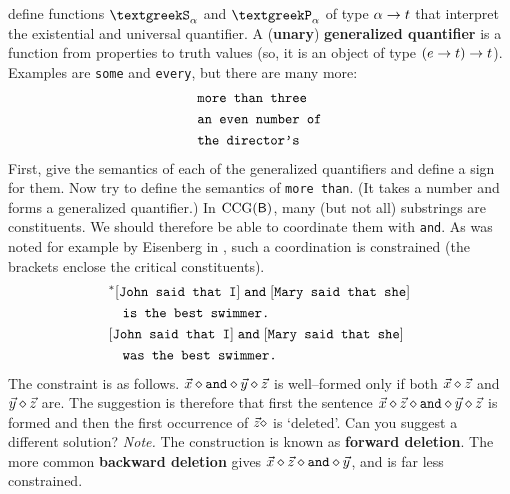 define functions $\GSi_{\alpha}$ and $\GPi_{\alpha}$ of type 
$\alpha \rightarrow t$ that interpret the existential and universal
quantifier. 
\vplatz
\exercise
A (\textbf{unary}) \textbf{generalized quantifier} is a function
from properties to truth values (so, it is an object of type
$(e \rightarrow t) \rightarrow t$). Examples are {\tt some} and {\tt every},
but there are many more:
\begin{align}
& \mbox{\tt more than three} \\
& \mbox{\tt an even number of} \\
& \mbox{\tt the director's}
\end{align}
First, give the semantics of each of the generalized
quantifiers and define a sign for them. Now try to
define the semantics of {\tt more than}. (It takes
a number and forms a generalized quantifier.)
\vplatz
\exercise
In $\operatorname{CCG}(\textsf{B})$, many (but not all) substrings are
constituents. We should therefore be able to coordinate them
with {\tt and}. As was noted for example by Eisenberg in
, such a coordination is
constrained (the brackets enclose the critical constituents).
\begin{align}
& ^{\ast}[\mbox{\tt John said that I}]\; \mbox{\tt and}\;
    [\mbox{\tt Mary said that she}] \\\notag
& \quad \mbox{\tt is the best swimmer.} \\
& [\mbox{\tt John said that I}] \;\mbox{\tt and}\;
    [\mbox{\tt Mary said that she}] \\\notag
    & \quad\mbox{\tt was the best swimmer.} 
\end{align}
The constraint is as follows. $\vec{x}\diamond\mbox{\tt and}\diamond\vec{y}
\diamond\vec{z}$ is well--formed only if both $\vec{x}\diamond\vec{z}$ and
$\vec{y}\diamond\vec{z}$ are. The suggestion is therefore that first
the sentence $\vec{x}\oconc\vec{z}\oconc\mbox{\tt and}\oconc\vec{y}%
\oconc\vec{z}$ is formed and then the first occurrence of $\vec{z}\diamond$ 
is `deleted'. Can you suggest a different solution? {\it Note.} The 
construction
is known as {\bf forward deletion}. The more common {\bf backward
deletion} gives $\vec{x}\diamond\vec{z}\diamond\mbox{\tt and}\diamond\vec{y}$, 
and is far less constrained.
